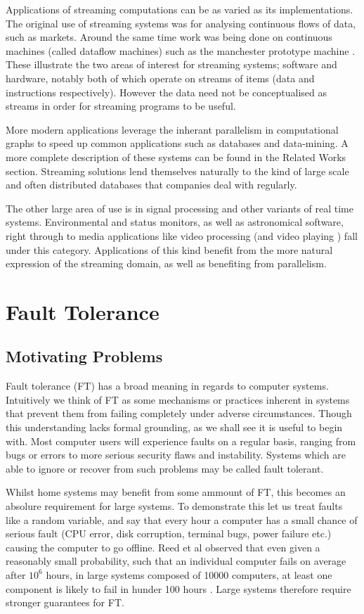 Applications of streaming computations can be as varied as its implementations.
The original use of streaming systems was for analysing continuous flows of data, such as markets.
Around the same time work was being done on continuous machines (called dataflow machines) such as the manchester prototype machine \cite{gur85}.
These illustrate the two areas of interest for streaming systems; software and hardware, notably both of which operate on streams of items (data and instructions respectively).
However the data need not be conceptualised as streams in order for streaming programs to be useful.

More modern applications leverage the inherant parallelism in computational graphs to speed up common applications such as databases and data-mining.
A more complete description of these systems can be found in the Related Works section.
Streaming solutions lend themselves naturally to the kind of large scale and often distributed databases that companies deal with regularly.

The other large area of use is in signal processing and other variants of real time systems.
Environmental and status monitors, as well as astronomical software, right through to media applications like video processing (and video playing \cite{thies02}) fall under this category.
Applications of this kind benefit from the more natural expression of the streaming domain, as well as benefiting from parallelism.

\section{Fault Tolerance}
\subsection{Motivating Problems}
Fault tolerance (FT) has a broad meaning in regards to computer systems.
Intuitively we think of FT as some mechanisms or practices inherent in systems that prevent them from failing completely under adverse circumstances.
Though this understanding lacks formal grounding, as we shall see it is useful to begin with.
Most computer users will experience faults on a regular basis, ranging from bugs or errors to more serious security flaws and instability.
Systems which are able to ignore or recover from such problems may be called fault tolerant.

Whilst home systems may benefit from some ammount of FT, this becomes an absolure requirement for large systems.
To demonstrate this let us treat faults like a random variable, and say that every hour a computer has a small chance of serious fault (CPU error, disk corruption, terminal bugs, power failure etc.) causing the computer to go offline.
Reed et al observed that even given a reasonably small probability, such that an individual computer fails on average after $10^6$ hours, in large systems composed of 10000 computers, at least one component is likely to fail in hunder 100 hours \cite{ree06}.
Large systems therefore require stronger guarantees for FT.

